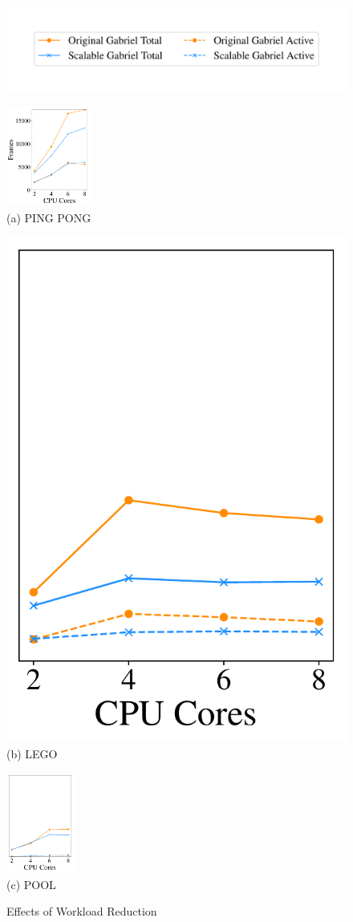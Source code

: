 \begin{figure}
\centering
\includegraphics[width=\linewidth, trim=0em 3em 0em 3em, clip]{FIGS/fig-sec6-reduction-legend.pdf}
\begin{minipage}[b]{0.38\linewidth}
\centering
\includegraphics[height=1.3in, trim=0em 1em 0em 0em, clip]{FIGS/fig-sec6-reduction-Pingpong.pdf}\\
{\small (a) PING PONG}
\end{minipage}
\begin{minipage}[b]{0.3\linewidth}
\includegraphics[height=1.3 in, trim=0em 1em 0em 0em, clip]{FIGS/fig-sec6-reduction-Lego.pdf}\\
{\small (b) LEGO}
\end{minipage}
\begin{minipage}[b]{0.3\linewidth}
\includegraphics[height=1.3in, trim=0em 1em 0em 0em, clip]{FIGS/fig-sec6-reduction-Pool.pdf}\\
{\small (c) POOL}
\end{minipage}
\caption{\small Effects of Workload Reduction}
\label{figs:workload-reduction}
\end{figure}


